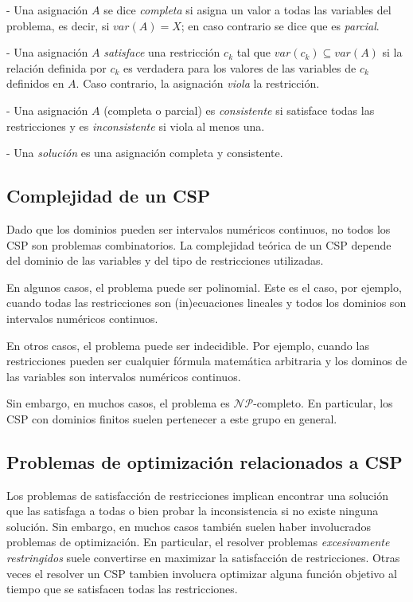 \documentclass{llncs}
\begin{document}
   - Una asignación $A$ se dice \textit{completa} si asigna un valor a todas las variables del
   problema, es decir, si $var(A) = X$; en caso contrario se dice que es \textit{parcial}.
   
   - Una asignación $A$ \textit{satisface} una restricción $c_k$ tal que $var(c_k) \subseteq var(A)$ si la relación definida por $c_k$ es verdadera para los valores de las variables de $c_k$ definidos en $A$. Caso contrario, la asignación \textit{viola} la restricción.
   
   - Una asignación $A$ (completa o parcial) es \textit{consistente} si satisface todas las restricciones y es \textit{inconsistente} si viola al menos una.
   
   - Una \textit{solución} es una asignación completa y consistente.
   
   \subsection{Complejidad de un CSP}
   \label{subsec:cspComplexity}
   	Dado que los dominios pueden ser intervalos numéricos continuos, no todos los CSP son
   	problemas combinatorios. La complejidad teórica de un CSP depende del dominio de las variables y del tipo de restricciones utilizadas.
   	
   	En algunos casos, el problema puede ser polinomial. Este es el caso, por ejemplo, cuando todas
   	las restricciones son (in)ecuaciones lineales y todos los dominios son intervalos numéricos
   	continuos.
   	
   	En otros casos, el problema puede ser indecidible. Por ejemplo, cuando las restricciones pueden ser cualquier fórmula matemática arbitraria y los dominos de las variables son intervalos numéricos continuos.
   	
   	Sin embargo, en muchos casos, el problema es $\mathcal{NP}$-completo. En particular, los CSP con dominios finitos suelen pertenecer a este grupo en general.
   	
   	\subsection{Problemas de optimización relacionados a CSP}
   	\label{subsec:cspOptimization}
   	Los problemas de satisfacción de restricciones implican encontrar una solución que las
   	satisfaga a todas o bien probar la inconsistencia si no existe ninguna solución. Sin embargo,
   	en muchos casos también suelen haber involucrados problemas de optimización. En particular,
   	el resolver problemas \textit{excesivamente restringidos} suele convertirse en maximizar la
   	satisfacción de restricciones. Otras veces el resolver un CSP tambien involucra optimizar
   	alguna función objetivo al tiempo que se satisfacen todas las restricciones.
   	
\end{document}
